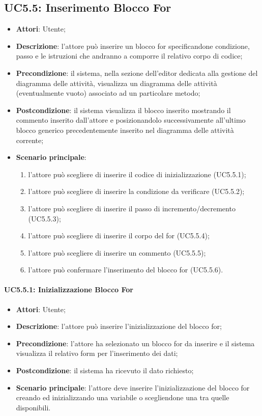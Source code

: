 \subsection{UC5.5: Inserimento Blocco For}
\label{UC5.5}
\begin{itemize}
\item \textbf{Attori}: Utente;
\item \textbf{Descrizione}: l'attore può inserire un blocco for specificandone condizione, passo e le istruzioni che andranno a comporre il relativo corpo di codice;	
\item \textbf{Precondizione}: il sistema, nella sezione dell'editor dedicata alla gestione del diagramma delle attività, visualizza un diagramma delle attività (eventualmente vuoto) associato ad un particolare metodo;	
\item \textbf{Postcondizione}: il sistema visualizza il blocco inserito mostrando il commento inserito dall'attore e posizionandolo successivamente all'ultimo blocco generico precedentemente 
inserito nel diagramma delle attività corrente;	
\item \textbf{Scenario principale}:
\begin{enumerate}
\item l'attore può scegliere di inserire il codice di inizializzazione (UC5.5.1);
\item l'attore può scegliere di inserire la condizione da verificare (UC5.5.2);
\item l'attore può scegliere di inserire il passo di incremento/decremento (UC5.5.3);
\item l'attore può scegliere di inserire il corpo del for (UC5.5.4);
\item l'attore può scegliere di inserire un commento (UC5.5.5);
\item l'attore può confermare l'inserimento del blocco for (UC5.5.6).
\end{enumerate}
\end{itemize}

\paragraph{UC5.5.1: Inizializzazione Blocco For}
\label{UC5.5.1}
\begin{itemize}
\item \textbf{Attori}: Utente;
\item \textbf{Descrizione}: l'attore può inserire l'inizializzazione del blocco for;
\item \textbf{Precondizione}:  l'attore ha selezionato un blocco for da inserire e il sistema visualizza il relativo form per l'inserimento dei dati;	
\item \textbf{Postcondizione}: il sistema ha ricevuto il dato richiesto;	
\item \textbf{Scenario principale}:
l'attore deve inserire l'inizializzazione del blocco for creando ed inizializzando una variabile o scegliendone una tra quelle disponibili.
\end{itemize}

